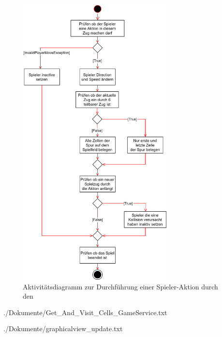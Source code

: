 \begin{figure}[htb]
	\centering
	\includegraphics[width=0.7\textwidth]{Bilder/game_service_do_action_activity_diagram.png}
	\caption{Aktivitätsdiagramm zur Durchführung einer Spieler-Aktion durch den }
	\label{fig:aktivitaetsdiagramm-spieleraktion-gameservice}
\end{figure}
\clearpage

\begin{minipage}{\textwidth}
	
	{./Dokumente/Get_And_Visit_Cells_GameService.txt}
\end{minipage}
\clearpage

\begin{minipage}{\textwidth}
	
	{./Dokumente/graphicalview_update.txt}
\end{minipage}
\clearpage

